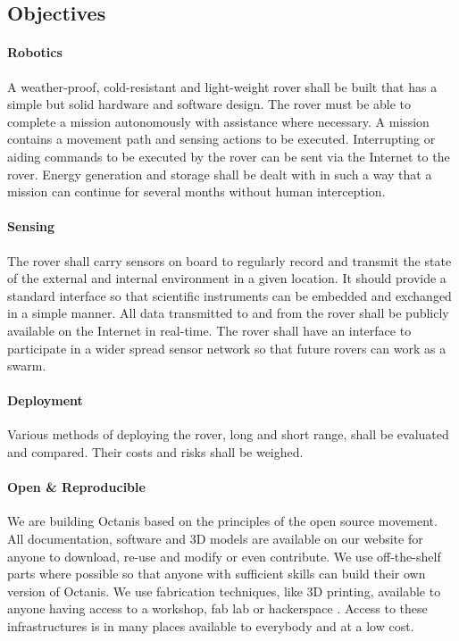\documentclass[a4paper,12pt]{article}
\begin{document}
\subsection{Objectives}


\paragraph{Robotics}
A weather-proof, cold-resistant and light-weight rover shall be built that has a simple but solid hardware and software design. The rover must be able to complete a mission autonomously with assistance where necessary. A mission contains a movement path and sensing actions to be executed. Interrupting or aiding commands to be executed by the rover can be sent via the Internet to the rover. Energy generation and storage shall be dealt with in such a way that a mission can continue for several months without human interception.

\paragraph{Sensing}
The rover shall carry sensors on board to regularly record and transmit the state of the external and internal environment in a given location. It should provide a standard interface so that scientific instruments can be embedded and exchanged in a simple manner. All data transmitted to and from the rover shall be publicly available on the Internet in real-time. The rover shall have an interface to participate in a wider spread sensor network so that future rovers can work as a swarm.

\paragraph{Deployment}
Various methods of deploying the rover, long and short range, shall be evaluated and compared. Their costs and risks shall be weighed.


\paragraph{Open \& Reproducible} 
We are building Octanis based on the principles of the open source movement. All documentation, software and 3D models are available on our website for anyone to download, re-use and modify or even contribute. We use off-the-shelf parts where possible so that anyone with sufficient skills can build their own version of Octanis. We use fabrication techniques, like 3D printing, available to anyone having access to a workshop, fab lab \cite{fablab} or hackerspace \cite{hackerspace}. Access to these infrastructures is in many places available to everybody and at a low cost.
 
\end{document}
